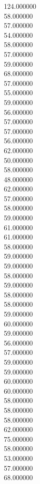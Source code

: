 124.000000\\
58.000000\\
57.000000\\
54.000000\\
58.000000\\
57.000000\\
59.000000\\
68.000000\\
57.000000\\
55.000000\\
59.000000\\
56.000000\\
57.000000\\
57.000000\\
56.000000\\
62.000000\\
50.000000\\
58.000000\\
48.000000\\
62.000000\\
57.000000\\
58.000000\\
59.000000\\
61.000000\\
61.000000\\
58.000000\\
59.000000\\
59.000000\\
58.000000\\
59.000000\\
58.000000\\
58.000000\\
59.000000\\
60.000000\\
59.000000\\
56.000000\\
57.000000\\
59.000000\\
59.000000\\
60.000000\\
60.000000\\
58.000000\\
58.000000\\
58.000000\\
62.000000\\
75.000000\\
58.000000\\
53.000000\\
57.000000\\
68.000000\\
